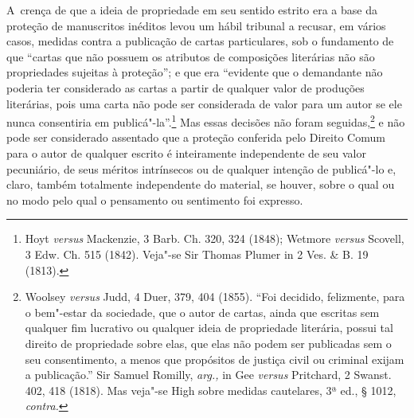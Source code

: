 A~crença de que a ideia de propriedade em seu sentido estrito era a base
da proteção de manuscritos inéditos levou um hábil tribunal a recusar,
em vários casos, medidas contra a publicação de cartas particulares, sob
o fundamento de que ``cartas que não possuem os atributos de composições
literárias não são propriedades sujeitas à proteção''; e que era
``evidente que o demandante não poderia ter considerado as cartas a
partir de qualquer valor de produções literárias, pois uma carta não
pode ser considerada de valor para um autor se ele nunca consentiria em
publicá"-la''.\footnote{Hoyt \emph{versus} Mackenzie, 3 Barb. Ch. 320,
  324 (1848); Wetmore \emph{versus} Scovell, 3 Edw. Ch. 515 (1842).
  Veja"-se Sir Thomas Plumer in 2 Ves. \& B. 19 (1813).} Mas essas
decisões não foram seguidas,\footnote{Woolsey \emph{versus} Judd, 4
  Duer, 379, 404 (1855). ``Foi decidido, felizmente, para o bem"-estar da
  sociedade, que o autor de cartas, ainda que escritas sem qualquer fim
  lucrativo ou qualquer ideia de propriedade literária, possui tal
  direito de propriedade sobre elas, que elas não podem ser publicadas
  sem o seu consentimento, a menos que propósitos de justiça civil ou
  criminal exijam a publicação.'' Sir Samuel Romilly, \emph{arg.,} in
  Gee \emph{versus} Pritchard, 2 Swanst. 402, 418 (1818). Mas veja"-se
  High sobre medidas cautelares, 3ª ed., § 1012, \emph{contra.}} e não
pode ser considerado assentado que a proteção conferida pelo Direito
Comum para o autor de qualquer escrito é inteiramente independente de
seu valor pecuniário, de seus méritos intrínsecos ou de qualquer
intenção de publicá"-lo e, claro, também totalmente independente do
material, se houver, sobre o qual ou no modo pelo qual o pensamento ou
sentimento foi expresso.

